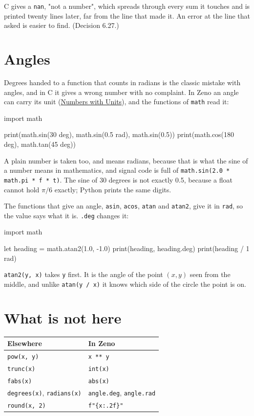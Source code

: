 \begin{why}
C gives a \verb|nan|, "not a number", which spreads through every sum
it touches and is printed twenty lines later, far from the line that
made it. An error at the line that asked is easier to find.
(Decision 6.27.)
\end{why}

\section{Angles}

Degrees handed to a function that counts in radians is the classic
mistake with angles, and in C it gives a wrong number with no
complaint. In Zeno an angle can carry its unit
(\hyperref[ch-units]{Numbers with Units}), and the functions of
\verb|math| read it:

\begin{zeno}
import math

print(math.sin(30 deg), math.sin(0.5 rad), math.sin(0.5))
print(math.cos(180 deg), math.tan(45 deg))
\end{zeno}

A plain number is taken too, and means radians, because that is what
the sine of a number means in mathematics, and signal code is full of
\verb|math.sin(2.0 * math.pi * f * t)|. The sine of 30 degrees is not
exactly 0.5, because a float cannot hold $\pi/6$ exactly; Python
prints the same digits.

The functions that give an angle, \verb|asin|, \verb|acos|,
\verb|atan| and \verb|atan2|, give it in \verb|rad|, so the value says
what it is. \verb|.deg| changes it:

\begin{zeno}
import math

let heading = math.atan2(1.0, -1.0)
print(heading, heading.deg)
print(heading / 1 rad)
\end{zeno}

\verb|atan2(y, x)| takes \verb|y| first. It is the angle of the point
$(x, y)$ seen from the middle, and unlike \verb|atan(y / x)| it knows
which side of the circle the point is on.

\section{What is not here}

\begin{center}
\begin{tabular}{ll}
\toprule
Elsewhere & In Zeno \\
\midrule
\verb|pow(x, y)| & \verb|x ** y| \\
\verb|trunc(x)| & \verb|int(x)| \\
\verb|fabs(x)| & \verb|abs(x)| \\
\verb|degrees(x)|, \verb|radians(x)| & \verb|angle.deg|, \verb|angle.rad| \\
\verb|round(x, 2)| & \verb|f"{x:.2f}"| \\
\bottomrule
\end{tabular}
\end{center}

